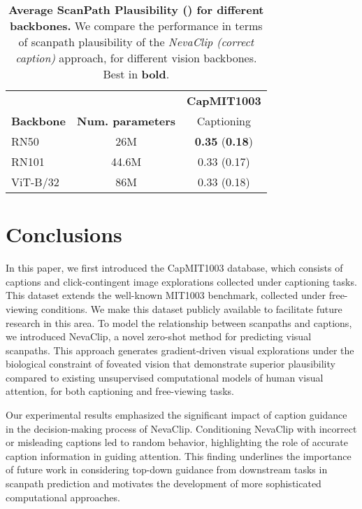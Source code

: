 \documentclass{article}
\begin{document}
\begin{table}[t]
\setlength{\abovecaptionskip}{5pt}
    \caption{\textbf{Average ScanPath Plausibility () for different backbones.} We compare the performance in terms of scanpath plausibility of the \textit{NevaClip (correct caption)} approach, for different vision backbones. Best in \textbf{bold}.}\label{tab:backbones}
    \centering
    \begin{tabular}{lcc}
    \hline
    \textbf{} & \textbf{} &  \textbf{CapMIT1003}  \\
    \textbf{Backbone} & \textbf{Num. parameters} & Captioning  \\
    \hline
    \hline
    RN50 \citep{radford2021learning} & 26M & \textbf{0.35} (\textbf{0.18})  \\
    RN101 \citep{radford2021learning} & 44.6M & 0.33 (0.17) \\
    ViT-B/32 \citep{radford2021learning} & 86M & 0.33 (0.18) \\
    \hline
    \end{tabular}

\end{table}


\section{Conclusions}

In this paper, we first introduced the CapMIT1003 database, which consists of captions and click-contingent image explorations collected under captioning tasks. This dataset extends the well-known MIT1003 benchmark, collected under free-viewing conditions. We make this dataset publicly available to facilitate future research in this area. To model the relationship between scanpaths and captions, we introduced NevaClip, a novel zero-shot method for predicting visual scanpaths. This approach generates gradient-driven visual explorations under the biological constraint of foveated vision that demonstrate superior plausibility compared to existing unsupervised computational models of human visual attention, for both captioning and free-viewing tasks.


Our experimental results emphasized the significant impact of caption guidance in the decision-making process of NevaClip. Conditioning NevaClip with incorrect or misleading captions led to random behavior, highlighting the role of accurate caption information in guiding attention. This finding underlines the importance of future work in considering top-down guidance from downstream tasks in scanpath prediction and motivates the development of more sophisticated computational approaches.
\end{document}
